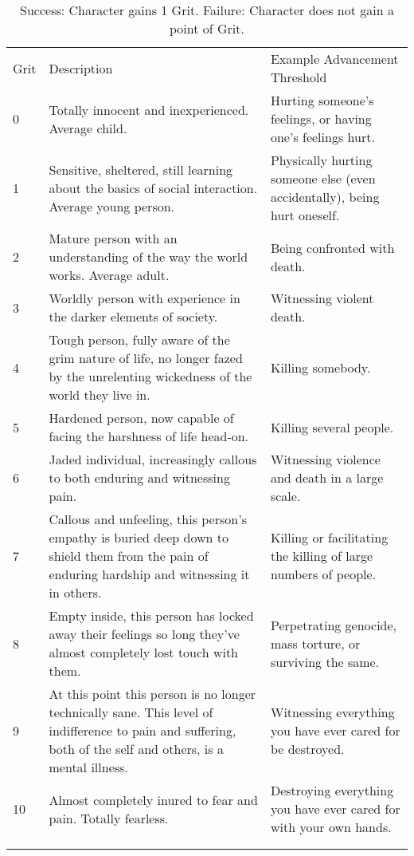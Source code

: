 \documentclass[oneside,11pt,english]{book}
\begin{document}
\begin{longtabu} spread 0pt {lXX}
	\caption{Grit Advancement}
	\label{tab:GritAdvancement}\\
Grit&Description&Example Advancement Threshold\\
0&Totally innocent and inexperienced. Average child.&Hurting someone’s feelings, or having one’s feelings hurt. \\
1&Sensitive, sheltered, still learning about the basics of social interaction. Average young person. & Physically hurting someone else (even accidentally), being hurt oneself. \\
2& Mature person with an understanding of the way the world works. Average adult. &Being confronted with death. \\
3&Worldly person with experience in the darker elements of society.& Witnessing violent death.\\
4&Tough person, fully aware of the grim nature of life, no longer fazed by the unrelenting wickedness of the world they live in. &Killing somebody. \\
5& Hardened person, now capable of facing the harshness of life head-on.&Killing several people. \\
6& Jaded individual, increasingly callous to both enduring and witnessing pain. &Witnessing violence and death in a large scale. \\
7& Callous and unfeeling, this person’s empathy is buried deep down to shield them from the pain of enduring hardship and witnessing it in others. &Killing or facilitating the killing of large numbers of people. \\
8& Empty inside, this person has locked away their feelings so long they’ve almost completely lost touch with them. &Perpetrating genocide, mass torture, or surviving the same.\\
9&At this point this person is no longer technically sane. This level of indifference to pain and suffering, both of the self and others, is a mental illness. &Witnessing everything you have ever cared for be destroyed. \\
10& Almost completely inured to fear and pain. Totally fearless. &Destroying everything you have ever cared for with your own hands. \\
		\\
		\caption*{Success: Character gains 1 Grit. \qquad Failure: Character does not gain a point of Grit.} %
\end{longtabu}
\end{document}

